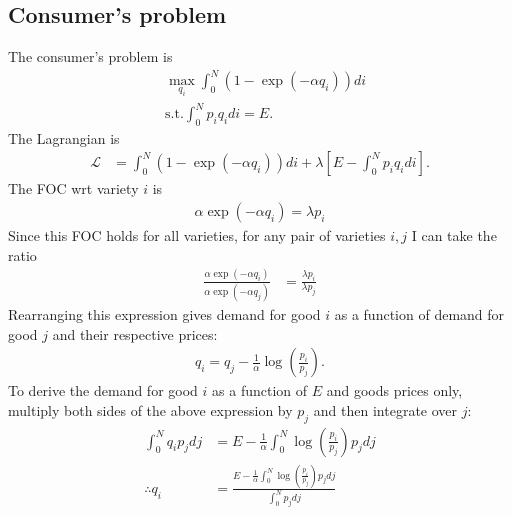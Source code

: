 \documentclass[12pt]{article}
\begin{document}
\subsection{Consumer's problem}
The consumer's problem is 
\begin{align*}
&\max_{q_i} \int_0^N (1-\exp(-\alpha q_i) )di\\
&\text{s.t.} \int_0^N p_i q_i di = E.
\end{align*}
The Lagrangian is
\begin{align*}
\mathcal{L} &=  \int_0^N (1-\exp(-\alpha q_i)) di + \lambda \left[ E -\int_0^N p_i q_i di \right].
\end{align*}
The FOC wrt variety $i$ is
\begin{align*}
\alpha \exp(-\alpha q_i) = \lambda p_i
\end{align*}
Since this FOC holds for all varieties, for any pair of varieties $i, j$ I can take the ratio
\begin{align*}
\frac{\alpha \exp(-\alpha q_i)}{\alpha \exp(-\alpha q_j)} & = \frac{\lambda p_i}{\lambda p_j}
\end{align*}
Rearranging this expression gives demand for good $i$ as a function of demand for good $j$ and their respective prices:
\begin{align}
q_i = q_j - \frac{1}{\alpha} \log\left(\frac{p_i}{p_j}\right). \label{eq:mpc1}
\end{align}
To derive the demand for good $i$ as a function of $E$ and goods prices only, multiply both sides of the above expression by $p_j$ and then integrate over $j$:
\begin{align}
\int_0^N q_i p_j dj &= E - \frac{1}{\alpha}\int_0^N \log\left(\frac{p_i}{p_j}\right)p_j dj \nonumber\\
\therefore q_i &=  \frac{E - \frac{1}{\alpha}\int_0^N \log\left(\frac{p_i}{p_j}\right)p_j dj}{\int_0^Np_j dj} \label{eq:mpc2a}
\end{align}
\end{document}

